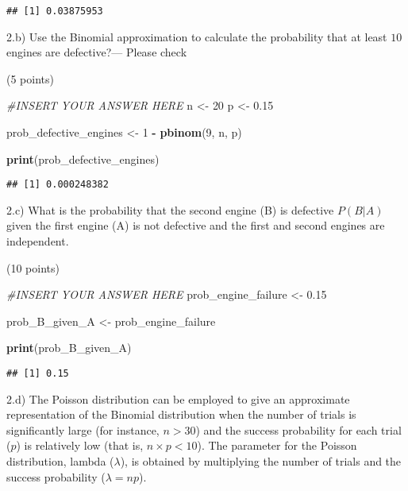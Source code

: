 \documentclass[
]{article}
\newenvironment{Shaded}{\begin{snugshade}}{\end{snugshade}}
\newcommand{\CommentTok}[1]{\textcolor[rgb]{0.56,0.35,0.01}{\textit{#1}}}
\newcommand{\DecValTok}[1]{\textcolor[rgb]{0.00,0.00,0.81}{#1}}
\newcommand{\FloatTok}[1]{\textcolor[rgb]{0.00,0.00,0.81}{#1}}
\newcommand{\FunctionTok}[1]{\textcolor[rgb]{0.13,0.29,0.53}{\textbf{#1}}}
\newcommand{\NormalTok}[1]{#1}
\newcommand{\OtherTok}[1]{\textcolor[rgb]{0.56,0.35,0.01}{#1}}
\newcommand{\SpecialCharTok}[1]{\textcolor[rgb]{0.81,0.36,0.00}{\textbf{#1}}}
\begin{document}
\begin{verbatim}
## [1] 0.03875953
\end{verbatim}

2.b) Use the Binomial approximation to calculate the probability that at
least \(10\) engines are defective?--- Please check

(5 points)

\begin{Shaded}
\begin{Highlighting}[]
\CommentTok{\#INSERT YOUR ANSWER HERE}
\NormalTok{n }\OtherTok{\textless{}{-}} \DecValTok{20}
\NormalTok{p }\OtherTok{\textless{}{-}} \FloatTok{0.15}

\NormalTok{prob\_defective\_engines }\OtherTok{\textless{}{-}} \DecValTok{1} \SpecialCharTok{{-}} \FunctionTok{pbinom}\NormalTok{(}\DecValTok{9}\NormalTok{, n, p)}

\FunctionTok{print}\NormalTok{(prob\_defective\_engines)}
\end{Highlighting}
\end{Shaded}

\begin{verbatim}
## [1] 0.000248382
\end{verbatim}

2.c) What is the probability that the second engine (B) is defective
\(P(B|A)\) given the first engine (A) is not defective and the first and
second engines are independent.

(10 points)

\begin{Shaded}
\begin{Highlighting}[]
\CommentTok{\#INSERT YOUR ANSWER HERE}
\NormalTok{prob\_engine\_failure }\OtherTok{\textless{}{-}} \FloatTok{0.15}

\NormalTok{prob\_B\_given\_A }\OtherTok{\textless{}{-}}\NormalTok{ prob\_engine\_failure}

\FunctionTok{print}\NormalTok{(prob\_B\_given\_A)}
\end{Highlighting}
\end{Shaded}

\begin{verbatim}
## [1] 0.15
\end{verbatim}

2.d) The Poisson distribution can be employed to give an approximate
representation of the Binomial distribution when the number of trials is
significantly large (for instance, \(n>30\)) and the success probability
for each trial (\(p\)) is relatively low (that is, \(n\times p<10\)).
The parameter for the Poisson distribution, lambda (\(\lambda\)), is
obtained by multiplying the number of trials and the success probability
(\(\lambda=np\)).
\end{document}
